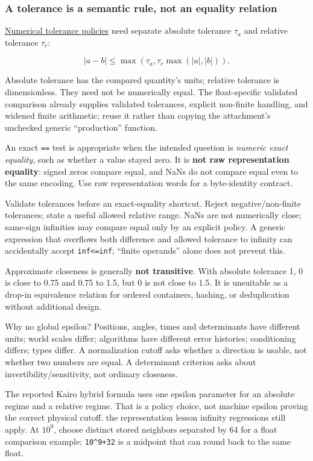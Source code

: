 \subsubsection{A tolerance is a semantic rule, not an equality relation}\label{05-engine-i-ch001-a-tolerance-is-a-semantic-rule-not-an-equality-relation}

\hyperref[appendix-0ec599f8ba27]{Numerical tolerance policies} need separate absolute tolerance \(\tau_a\) and relative tolerance \(\tau_r\):

\[
|a-b|\le\max\!\left(\tau_a,\tau_r\max(|a|,|b|)\right).
\]

Absolute tolerance has the compared quantity's units; relative tolerance is dimensionless. They need not be numerically equal. The float-specific validated comparison already supplies validated tolerances, explicit non-finite handling, and widened finite arithmetic; reuse it rather than copying the attachment's unchecked generic ``production'' function.

An exact \texttt{==} test is appropriate when the intended question is \emph{numeric exact equality}, such as whether a value stayed zero. It is \textbf{not raw representation equality}: signed zeros compare equal, and NaNs do not compare equal even to the same encoding. Use raw representation words for a byte-identity contract.

Validate tolerances before an exact-equality shortcut. Reject negative/non-finite tolerances; state a useful allowed relative range. NaNs are not numerically close; same-sign infinities may compare equal only by an explicit policy. A generic expression that overflows both difference and allowed tolerance to infinity can accidentally accept \texttt{inf\textless{}=inf}; ``finite operands'' alone does not prevent this.

Approximate closeness is generally \textbf{not transitive}. With absolute tolerance 1, 0 is close to 0.75 and 0.75 to 1.5, but 0 is not close to 1.5. It is unsuitable as a drop-in equivalence relation for ordered containers, hashing, or deduplication without additional design.

Why no global epsilon? Positions, angles, times and determinants have different units; world scales differ; algorithms have different error histories; conditioning differs; types differ. A normalization cutoff asks whether a direction is usable, not whether two numbers are equal. A determinant criterion asks about invertibility/sensitivity, not ordinary closeness.

The reported Kairo hybrid formula uses one epsilon parameter for an absolute regime and a relative regime. That is a policy choice, not machine epsilon proving the correct physical cutoff. the representation lesson infinity regressions still apply. At \(10^9\), choose distinct stored neighbors separated by 64 for a float comparison example; \texttt{10\^{}9+32} is a midpoint that can round back to the same float.

